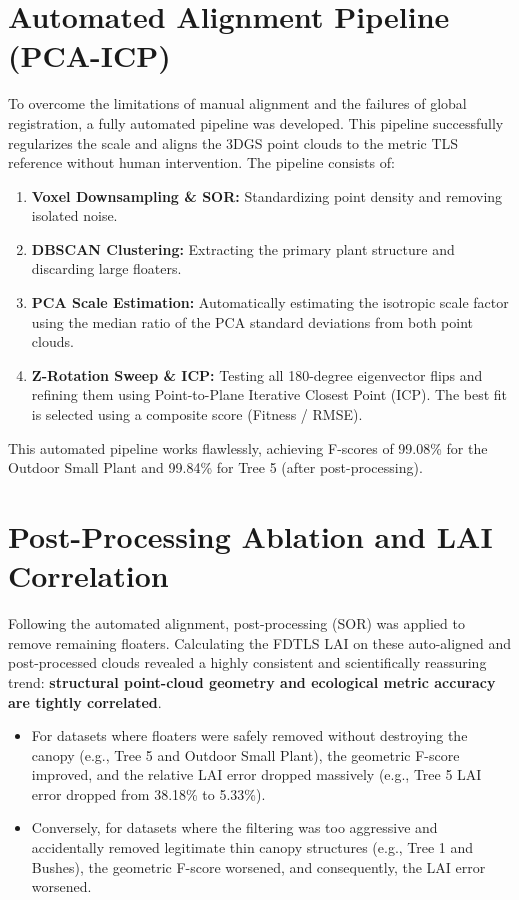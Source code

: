 \documentclass[12pt]{article}
\begin{document}
\section{Automated Alignment Pipeline (PCA-ICP)}
To overcome the limitations of manual alignment and the failures of global registration, a fully automated pipeline was developed. This pipeline successfully regularizes the scale and aligns the 3DGS point clouds to the metric TLS reference without human intervention. The pipeline consists of:
\begin{enumerate}
    \item \textbf{Voxel Downsampling \& SOR:} Standardizing point density and removing isolated noise.
    \item \textbf{DBSCAN Clustering:} Extracting the primary plant structure and discarding large floaters.
    \item \textbf{PCA Scale Estimation:} Automatically estimating the isotropic scale factor using the median ratio of the PCA standard deviations from both point clouds.
    \item \textbf{Z-Rotation Sweep \& ICP:} Testing all 180-degree eigenvector flips and refining them using Point-to-Plane Iterative Closest Point (ICP). The best fit is selected using a composite score (Fitness / RMSE).
\end{enumerate}

This automated pipeline works flawlessly, achieving F-scores of 99.08\% for the Outdoor Small Plant and 99.84\% for Tree 5 (after post-processing).

\section{Post-Processing Ablation and LAI Correlation}
Following the automated alignment, post-processing (SOR) was applied to remove remaining floaters. Calculating the FDTLS LAI on these auto-aligned and post-processed clouds revealed a highly consistent and scientifically reassuring trend: \textbf{structural point-cloud geometry and ecological metric accuracy are tightly correlated}.

\begin{itemize}
    \item For datasets where floaters were safely removed without destroying the canopy (e.g., Tree 5 and Outdoor Small Plant), the geometric F-score improved, and the relative LAI error dropped massively (e.g., Tree 5 LAI error dropped from 38.18\% to 5.33\%).
    \item Conversely, for datasets where the filtering was too aggressive and accidentally removed legitimate thin canopy structures (e.g., Tree 1 and Bushes), the geometric F-score worsened, and consequently, the LAI error worsened.
\end{itemize}
\end{document}
